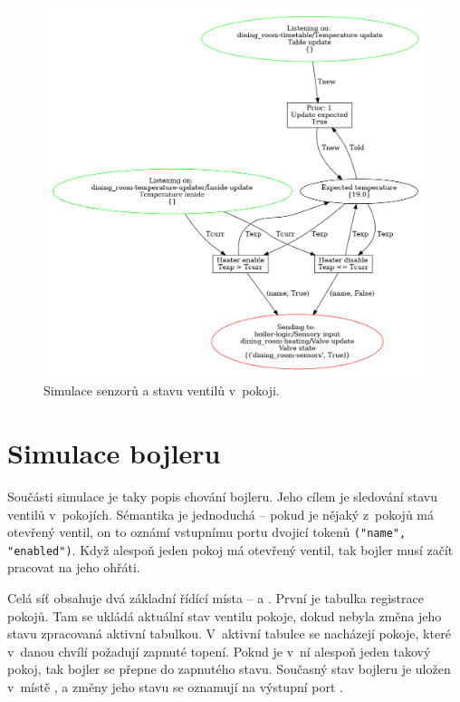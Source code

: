 \begin{figure}[htb]
 \centering
 \includegraphics[width=\textwidth]{obrazky-figures/room-sensors.png}
 \caption{Simulace senzorů a stavu ventilů v~pokoji.}
 \label{sensor-viz}
\end{figure}


\section{Simulace bojleru}
\label{sec:boiler-net-details}

Součásti simulace je taky popis chování bojleru. Jeho cílem je sledování stavu ventilů v~pokojích. Sémantika je jednoduchá -- pokud je nějaký z~pokojů má otevřený ventil, on to oznámí vstupnímu portu  dvojicí tokenů \texttt{("name", "enabled")}. Když alespoň jeden pokoj má otevřený ventil, tak bojler musí začít pracovat na jeho ohřáti.

Celá síť obsahuje dvá základní řídící místa --  a . První je tabulka registrace pokojů. Tam se ukládá aktuální stav ventilu pokoje, dokud nebyla změna jeho stavu zpracovaná aktivní tabulkou. V~aktivní tabulce se nacházejí pokoje, které v~danou chvílí požadují zapnuté topení. Pokud je v~ní alespoň jeden takový pokoj, tak bojler se přepne do zapnutého stavu. Současný stav bojleru je uložen v~místě , a změny jeho stavu se oznamují na výstupní port .

